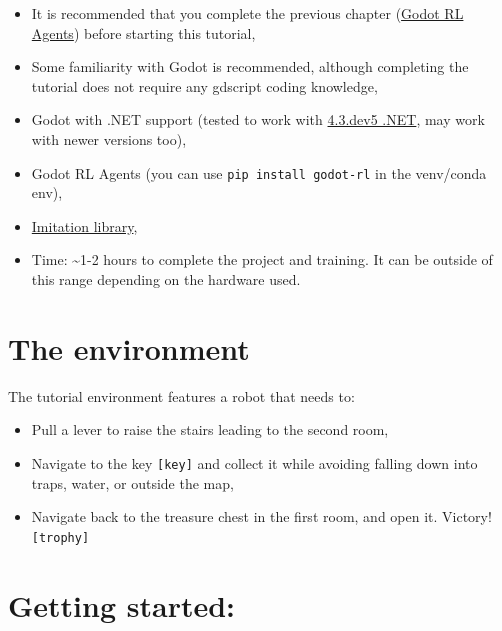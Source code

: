 \documentclass[11pt,a4paper]{article}
\begin{document}
\begin{itemize}
\tightlist
\item
  It is recommended that you complete the previous chapter (\href{https://huggingface.co/learn/deep-rl-course/unitbonus3/godotrl}{Godot RL Agents}) before starting this tutorial,
\item
  Some familiarity with Godot is recommended, although completing the tutorial does not require any gdscript coding knowledge,
\item
  Godot with .NET support (tested to work with \href{https://godotengine.org/article/dev-snapshot-godot-4-3-dev-5/}{4.3.dev5 .NET}, may work with newer versions too),
\item
  Godot RL Agents (you can use \passthrough{\lstinline!pip install godot-rl!} in the venv/conda env),
\item
  \href{https://huggingface.co/learn/deep-rl-course/unitbonus5/train-our-robot}{Imitation library},
\item
  Time: \textasciitilde1-2 hours to complete the project and training. It can be outside of this range depending on the hardware used.
\end{itemize}

\section{The environment}\label{the-environment}


The tutorial environment features a robot that needs to:

\begin{itemize}
\tightlist
\item
  Pull a lever to raise the stairs leading to the second room,
\item
  Navigate to the key \texttt{[key]} and collect it while avoiding falling down into traps, water, or outside the map,
\item
  Navigate back to the treasure chest in the first room, and open it. Victory! \texttt{[trophy]}
\end{itemize}

\section{Getting started:}\label{getting-started}
\end{document}
